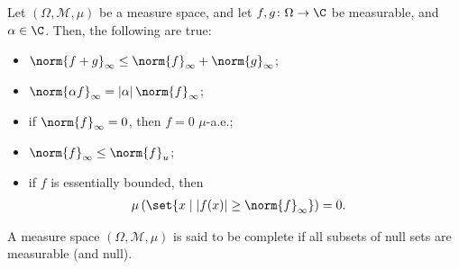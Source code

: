 \begin{fact}
  Let $\left(\Omega,\mathcal{M},\mu\right)$ be a measure space, and let $f,g\colon \Omega\rightarrow \C$ be measurable, and $\alpha \in \C$. Then, the following are true:
  \begin{itemize}
    \item $\displaystyle \norm{f+g}_{\infty}\leq \norm{f}_{\infty} + \norm{g}_{\infty}$;
    \item $\displaystyle \norm{\alpha f}_{\infty} = \left\vert \alpha \right\vert\norm{f}_{\infty}$;
    \item if $\displaystyle \norm{f}_{\infty} = 0$, then $f = 0$ $\mu$-a.e.;
    \item $\displaystyle \norm{f}_{\infty}\leq \norm{f}_{u}$;
    \item if $f$ is essentially bounded, then
      \begin{align*}
        \mu\left(\set{x\mid \left\vert f(x) \right\vert\geq \norm{f}_{\infty}}\right) &= 0.
      \end{align*}
  \end{itemize}
\end{fact}

\begin{definition}
A measure space $\left(\Omega,\mathcal{M},\mu\right)$ is said to be complete if all subsets of null sets are measurable (and null).
\end{definition}
